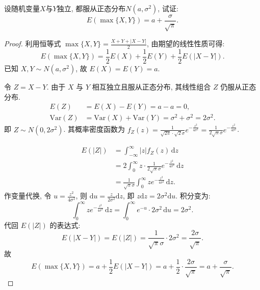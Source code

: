 \documentclass[../main.tex]{subfiles}
\begin{document}
\begin{exercise}{}{}
设随机变量$X$与$Y$独立, 都服从正态分布$N(a,\sigma^2)$, 试证:
\[
E(\max\{X,Y\}) = a + \frac{\sigma}{\sqrt{\pi}}.
\]
\end{exercise}
\begin{proof}
  利用恒等式 $\max\{X, Y\} = \frac{X + Y + |X - Y|}{2}$, 由期望的线性性质可得:
  \[
  E(\max\{X, Y\}) = \frac{1}{2}E(X) + \frac{1}{2}E(Y) + \frac{1}{2}E(|X - Y|).
  \]
  已知 $X, Y \sim N(a, \sigma^2)$, 故 $E(X) = E(Y) = a$. 
  
  令 $Z = X - Y$. 由于 $X$ 与 $Y$ 相互独立且服从正态分布, 其线性组合 $Z$ 仍服从正态分布.
  \[
  \begin{aligned}
  E(Z) &= E(X) - E(Y) = a - a = 0, \\
  \text{Var}(Z) &= \text{Var}(X) + \text{Var}(Y) = \sigma^2 + \sigma^2 = 2\sigma^2.
  \end{aligned}
  \]
  即 $Z \sim N(0, 2\sigma^2)$. 其概率密度函数为 $f_Z(z) = \frac{1}{\sqrt{2\pi} \cdot \sqrt{2}\sigma} e^{-\frac{z^2}{4\sigma^2}} = \frac{1}{2\sqrt{\pi}\sigma} e^{-\frac{z^2}{4\sigma^2}}$.
  
  
  \[
  \begin{aligned}
  E(|Z|) &= \int_{-\infty}^{\infty} |z| f_Z(z) \,\mathrm{d} z \\
  &= 2 \int_{0}^{\infty} z \cdot \frac{1}{2\sqrt{\pi}\sigma} e^{-\frac{z^2}{4\sigma^2}} \,\mathrm{d} z  \\
  &= \frac{1}{\sqrt{\pi}\sigma} \int_{0}^{\infty} z e^{-\frac{z^2}{4\sigma^2}} \,\mathrm{d} z.
  \end{aligned}
  \]
  作变量代换, 令 $u = \frac{z^2}{4\sigma^2}$, 则 $\mathrm{d} u = \frac{z}{2\sigma^2} \mathrm{d} z$, 即 $z \mathrm{d} z = 2\sigma^2 \mathrm{d} u$. 积分变为:
  \[
  \int_{0}^{\infty} z e^{-\frac{z^2}{4\sigma^2}} \,\mathrm{d} z = \int_{0}^{\infty} e^{-u} \cdot 2\sigma^2 \,\mathrm{d} u = 2\sigma^2.
  \]
  代回 $E(|Z|)$ 的表达式:
  \[
  E(|X - Y|) = E(|Z|) = \frac{1}{\sqrt{\pi}\sigma} \cdot 2\sigma^2 = \frac{2\sigma}{\sqrt{\pi}}.
  \]
  故
  \[
  E(\max\{X, Y\}) = a + \frac{1}{2} E(|X - Y|) = a + \frac{1}{2} \cdot \frac{2\sigma}{\sqrt{\pi}} = a + \frac{\sigma}{\sqrt{\pi}}.
  \]
\end{proof}
\end{document}
